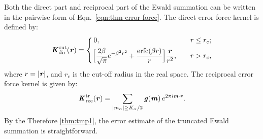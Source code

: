 \documentclass[aps,pre,preprint]{revtex4}
\renewcommand{\v}[1]{\textbf{\textit{#1}}}
\begin{document}
Both the direct part and reciprocal part of the Ewald summation can be
written in the pairwise form of Eqn.~\eqref{eqn:thm-error-force}.  The direct
error force kernel is defined by:
\begin{align}
  \v K^{\textrm{cut}}_{\textrm{dir}}(\v r) =
  \left\{
    \begin{aligned}
      &\,0, &\quad & r \leq r_c;\\
      &
      \Big[
      \frac{2\beta}{\sqrt\pi} e^{-\beta^2r^2} + \frac{\textrm{erfc}(\beta r)}{r}
      \Big]\frac{\v r}{r^2}
      ,& & r > r_c,
    \end{aligned}
  \right.
\end{align}
where $r = \vert\v r\vert$, and $r_c$ is the cut-off radius in the
real space.
The reciprocal error force kernel is given by:
\begin{align}
  \v K^{\textrm{tr}}_{\textrm{rec}}(\v r) =
  \sum_{
      \vert m_\alpha\vert \geq K_\alpha/2}
  \v g(\v m) \,
  e^{2\pi i\v m\cdot\v r}.
\end{align}
By the Therefore \ref{thm:tmp1}, the error estimate of the
truncated Ewald summation is straightforward.


\end{document}
